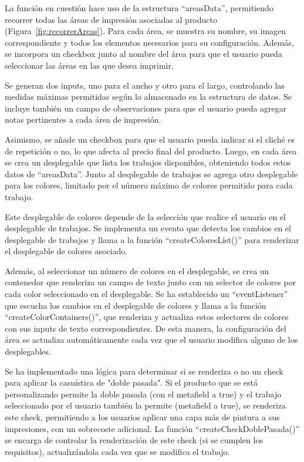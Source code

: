 \documentclass[12pt]{article}
\begin{document}
La función en cuestión hace uso de la estructura ``areasData'', permitiendo recorrer todas las áreas de impresión asociadas al producto (Figura~\ref{fig:recorrerAreas}). 
Para cada área, se muestra su nombre, su imagen correspondiente y todos los elementos necesarios para su configuración. Además, se incorpora
un checkbox junto al nombre del área para que el usuario pueda seleccionar las áreas en las que desea imprimir.

Se generan dos inputs, uno para el ancho y otro para el largo, controlando las medidas máximas permitidas según lo almacenado en la estructura de datos.
Se incluye también un campo de observaciones para que el usuario pueda agregar notas pertinentes a cada área de impresión.

Asimismo, se añade un checkbox para que el usuario pueda indicar si el cliché es de repetición o no, lo que afecta al precio final del producto. Luego, 
en cada área se crea un desplegable que lista los trabajos disponibles, obteniendo todos estos datos de ``areasData''. Junto al desplegable de trabajos se agrega 
otro desplegable para los colores, limitado por el número máximo de colores permitido para cada trabajo.

Este desplegable de colores depende de la selección que realice el usuario en el desplegable de trabajos. Se implementa un evento que detecta los cambios en el 
desplegable de trabajos y llama a la función ``createColoresList()'' para renderizar el desplegable de colores asociado.

Además, al seleccionar un número de colores en el desplegable, se crea un contenedor que renderiza un campo de texto junto con un selector de colores por cada 
color seleccionado en el desplegable. Se ha establecido un ``eventListener'' que escucha los cambios en el desplegable de colores y llama a la función 
``createColorContainers()'', que renderiza y actualiza estos selectores de colores con sus inputs de texto correspondientes. De esta manera, 
la configuración del área se actualiza automáticamente cada vez que el usuario modifica alguno de los desplegables.

Se ha implementado una lógica para determinar si se renderiza o no un check para aplicar la casuística de "doble pasada". Si el producto que se está 
personalizando permite la doble pasada (con el metafield a true) y el trabajo seleccionado por el usuario también la permite 
(metafield a true), se renderiza este check, permitiendo a los usuarios aplicar una capa más de pintura a sus impresiones, 
con un sobrecoste adicional. La función ``createCheckDoblePasada()'' se encarga de controlar la renderización de este check (si se cumplen los requisitos), 
actualizándola cada vez que se modifica el trabajo.
\end{document}
